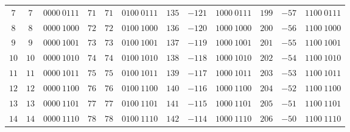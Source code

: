 \begin{center}
\begin{minipage}{0.5\linewidth}
\begin{center}
\begin{tabular}{|c|c|c||c|c|c||c|c|c||c|c|c|}
            \textcolor{numColor}{$7$} & \textcolor{twoColor}{$7$} & $0000~0111$ & \textcolor{numColor}{$71$} & \textcolor{twoColor}{$71$} & $0100~0111$ & \textcolor{numColor}{$135$} & \textcolor{twoColor}{$-121$} & $1000~0111$ & \textcolor{numColor}{$199$} & \textcolor{twoColor}{$-57$} & $1100~0111$\\ 
            \textcolor{numColor}{$8$} & \textcolor{twoColor}{$8$} & $0000~1000$ & \textcolor{numColor}{$72$} & \textcolor{twoColor}{$72$} & $0100~1000$ & \textcolor{numColor}{$136$} & \textcolor{twoColor}{$-120$} & $1000~1000$ & \textcolor{numColor}{$200$} & \textcolor{twoColor}{$-56$} & $1100~1000$\\ 
            \textcolor{numColor}{$9$} & \textcolor{twoColor}{$9$} & $0000~1001$ & \textcolor{numColor}{$73$} & \textcolor{twoColor}{$73$} & $0100~1001$ & \textcolor{numColor}{$137$} & \textcolor{twoColor}{$-119$} & $1000~1001$ & \textcolor{numColor}{$201$} & \textcolor{twoColor}{$-55$} & $1100~1001$\\ 
            \textcolor{numColor}{$10$} & \textcolor{twoColor}{$10$} & $0000~1010$ & \textcolor{numColor}{$74$} & \textcolor{twoColor}{$74$} & $0100~1010$ & \textcolor{numColor}{$138$} & \textcolor{twoColor}{$-118$} & $1000~1010$ & \textcolor{numColor}{$202$} & \textcolor{twoColor}{$-54$} & $1100~1010$\\ 
            \textcolor{numColor}{$11$} & \textcolor{twoColor}{$11$} & $0000~1011$ & \textcolor{numColor}{$75$} & \textcolor{twoColor}{$75$} & $0100~1011$ & \textcolor{numColor}{$139$} & \textcolor{twoColor}{$-117$} & $1000~1011$ & \textcolor{numColor}{$203$} & \textcolor{twoColor}{$-53$} & $1100~1011$\\ 
            \textcolor{numColor}{$12$} & \textcolor{twoColor}{$12$} & $0000~1100$ & \textcolor{numColor}{$76$} & \textcolor{twoColor}{$76$} & $0100~1100$ & \textcolor{numColor}{$140$} & \textcolor{twoColor}{$-116$} & $1000~1100$ & \textcolor{numColor}{$204$} & \textcolor{twoColor}{$-52$} & $1100~1100$\\ 
            \textcolor{numColor}{$13$} & \textcolor{twoColor}{$13$} & $0000~1101$ & \textcolor{numColor}{$77$} & \textcolor{twoColor}{$77$} & $0100~1101$ & \textcolor{numColor}{$141$} & \textcolor{twoColor}{$-115$} & $1000~1101$ & \textcolor{numColor}{$205$} & \textcolor{twoColor}{$-51$} & $1100~1101$\\ 
            \textcolor{numColor}{$14$} & \textcolor{twoColor}{$14$} & $0000~1110$ & \textcolor{numColor}{$78$} & \textcolor{twoColor}{$78$} & $0100~1110$ & \textcolor{numColor}{$142$} & \textcolor{twoColor}{$-114$} & $1000~1110$ & \textcolor{numColor}{$206$} & \textcolor{twoColor}{$-50$} & $1100~1110$\\ 

\end{tabular}
\end{center}
\end{minipage}
\end{center}

